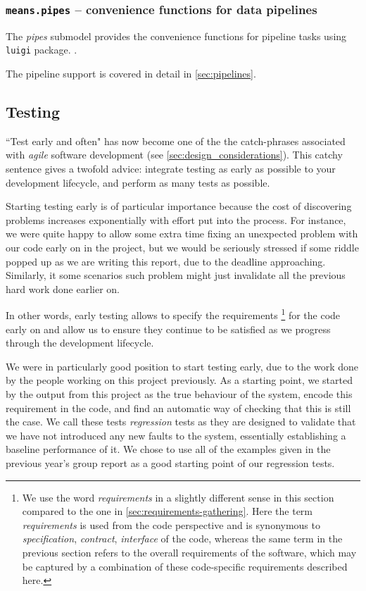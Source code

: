 \subsubsection{{\tt means.pipes} -- convenience functions for data pipelines}
The \emph{pipes} submodel provides the convenience functions for pipeline tasks using \verb"luigi" package. .

The pipeline support is covered in detail in \autoref{sec:pipelines}.

\subsection{Testing}
\label{sec:testing}

``Test early and often" has now become one of the the catch-phrases associated with \emph{agile} software development (see \autoref{sec:design_considerations}). 
This catchy sentence gives a twofold advice: integrate testing as early as possible to your development lifecycle, and perform as many tests as possible.

Starting testing early is of particular importance because the cost of discovering problems increases exponentially with effort put into the process.  
For instance, we were quite happy to allow some extra time fixing an unexpected problem with our code early on in the project, but we would be seriously stressed if some riddle popped up as we are writing this report, due to the deadline approaching. 
Similarly, it some scenarios such problem might just invalidate all the previous hard work done earlier on.

In other words, early testing allows to specify the requirements
    \footnote{We use the word \emph{requirements} in a slightly different sense in this section compared to the one in \autoref{sec:requirements-gathering}. 
    Here the term \emph{requirements} is used from the code perspective and is synonymous to \emph{specification}, \emph{contract}, \emph{interface} of the code, whereas the same term in the previous section refers to the overall requirements of the software, which may be captured by a combination of these code-specific requirements described here.} 
for the code early on and allow us to ensure they continue to be satisfied as we progress through the development lifecycle. 


We were in particularly good position to start testing early, due to the work done by the people working on this project previously. 
As a starting point, we started by the output from this project as the true behaviour of the system, encode this requirement in the code, and find an automatic way of checking that this is still the case. 
We call these tests \emph{regression} tests as they are designed to validate that we have not introduced any new faults to the system,
essentially establishing a baseline performance of it.
We chose to use all of the examples given in the previous year's group report as a good starting point of our regression tests.

